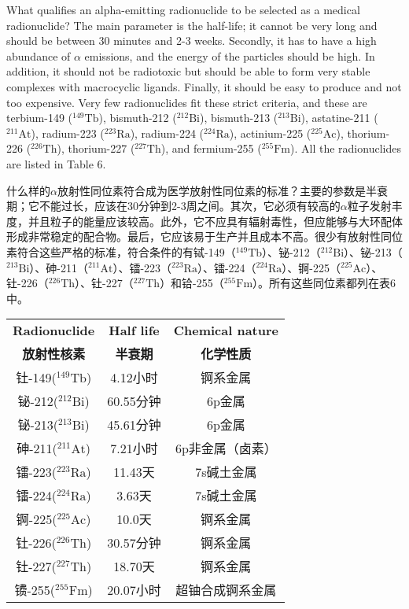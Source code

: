 \documentclass[dvipsnames, svgnames,a4paper,11pt]{article}
\begin{document}
What qualifies an alpha-emitting radionuclide to be selected as a medical radionuclide? The main parameter is the half-life; it cannot be very long and should be between 30 minutes and 2-3 weeks. Secondly, it has to have a high abundance of \(\alpha\) emissions, and the energy of the particles should be high. In addition, it should not be radiotoxic but should be able to form very stable complexes with macrocyclic ligands. Finally, it should be easy to produce and not too expensive. Very few radionuclides fit these strict criteria, and these are terbium-149 (\(\mathrm{^{149}Tb}\)), bismuth-212 (\(\mathrm{^{212}Bi}\)), bismuth-213 (\(\mathrm{^{213}Bi}\)), astatine-211 (\(\mathrm{^{211}At}\)), radium-223 (\(\mathrm{^{223}Ra}\)), radium-224 (\(\mathrm{^{224}Ra}\)), actinium-225 (\(\mathrm{^{225}Ac}\)), thorium-226 (\(\mathrm{^{226}Th}\)), thorium-227 (\(\mathrm{^{227}Th}\)), and fermium-255 (\(\mathrm{^{255}Fm}\)). All the radionuclides are listed in Table 6.

什么样的$\alpha$放射性同位素符合成为医学放射性同位素的标准？主要的参数是半衰期；它不能过长，应该在30分钟到2-3周之间。其次，它必须有较高的$\alpha$粒子发射丰度，并且粒子的能量应该较高。此外，它不应具有辐射毒性，但应能够与大环配体形成非常稳定的配合物。最后，它应该易于生产并且成本不高。很少有放射性同位素符合这些严格的标准，符合条件的有铽-149（\(\mathrm{^{149}Tb}\)）、铋-212（\(\mathrm{^{212}Bi}\)）、铋-213（\(\mathrm{^{213}Bi}\)）、砷-211（\(\mathrm{^{211}At}\)）、镭-223（\(\mathrm{^{223}Ra}\)）、镭-224（\(\mathrm{^{224}Ra}\)）、锕-225（\(\mathrm{^{225}Ac}\)）、钍-226（\(\mathrm{^{226}Th}\)）、钍-227（\(\mathrm{^{227}Th}\)）和铪-255（\(\mathrm{^{255}Fm}\)）。所有这些同位素都列在表6中。

\begin{table}[H]
\centering
{}\label{table6}
\begin{tabular}{ccc}
\toprule
\textbf{Radionuclide} & \textbf{Half life} & \textbf{Chemical nature} \\
\textbf{放射性核素} & \textbf{半衰期} & \textbf{化学性质} \\
\hline
钍-149($\mathrm{^{149}Tb}$) & 4.12小时 & 锕系金属 \\
铋-212($\mathrm{^{212}Bi}$) & 60.55分钟 & 6p金属 \\
铋-213($\mathrm{^{213}Bi}$) & 45.61分钟 & 6p金属 \\
砷-211($\mathrm{^{211}At}$) & 7.21小时 & 6p非金属（卤素） \\
镭-223($\mathrm{^{223}Ra}$) & 11.43天 & 7s碱土金属 \\
镭-224($\mathrm{^{224}Ra}$) & 3.63天 & 7s碱土金属 \\
锕-225($\mathrm{^{225}Ac}$) & 10.0天 & 锕系金属 \\
钍-226($\mathrm{^{226}Th}$) & 30.57分钟 & 锕系金属 \\
钍-227($\mathrm{^{227}Th}$) & 18.70天 & 锕系金属 \\
镄-255($\mathrm{^{255}Fm}$) & 20.07小时 & 超铀合成锕系金属 \\
\hline
\end{tabular}
\end{table}
\end{document}

